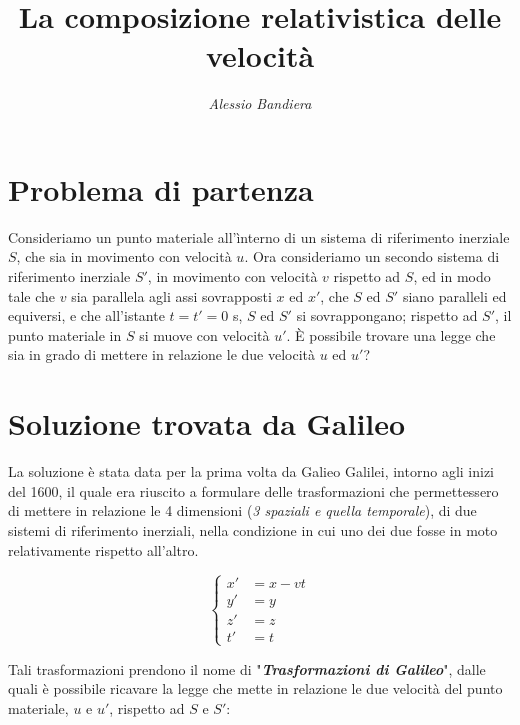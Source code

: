 \documentclass{article}
\begin{document}
\title{\textbf{La composizione relativistica delle velocità}}
\author{\textit{Alessio Bandiera}}
\date{} %

\maketitle

\section{Problema di partenza}
\null\par
Consideriamo un punto materiale all'ìnterno di un sistema
di riferimento inerziale \(S\), che sia in movimento con
velocità \(u\). Ora consideriamo un secondo sistema di
riferimento inerziale \(S'\), in movimento con velocità
\(v\) rispetto ad \(S\), ed in modo tale che  \(v\) sia parallela
agli assi sovrapposti \(x\) ed \(x'\), che \(S\) ed \(S'\) siano
paralleli ed equiversi, e che all'istante \(t=t'=0\) s, \(S\)
ed \(S'\) si sovrappongano; rispetto ad \(S'\), il punto
materiale in \(S\) si muove con velocità \(u'\). \`E possibile
trovare una legge che sia in grado di mettere in relazione
le due velocità \(u\) ed \(u'\)?

\section{Soluzione trovata da Galileo}
La soluzione è stata data per la prima volta da Galieo Galilei,
intorno agli inizi del 1600, il quale era riuscito a formulare
delle trasformazioni che permettessero di mettere in relazione
le 4 dimensioni (\textit{3 spaziali e quella temporale}), di due
sistemi di riferimento inerziali, nella condizione in cui uno
dei due fosse in moto relativamente rispetto all'altro.

\begin{equation}
    \left\{
        \begin{aligned}
        x' &= x - vt \\
        y' &= y \\
        z' &= z \\
        t' &= t
        \end{aligned}
    \right.
\end{equation}

Tali
trasformazioni prendono il nome di "\textbf{\textit{Trasformazioni di Galileo}}",
dalle quali è possibile ricavare la legge che mette in relazione
le due velocità del punto materiale, \(u\) e \(u'\), rispetto
ad \(S\) e \(S'\):
\end{document}

